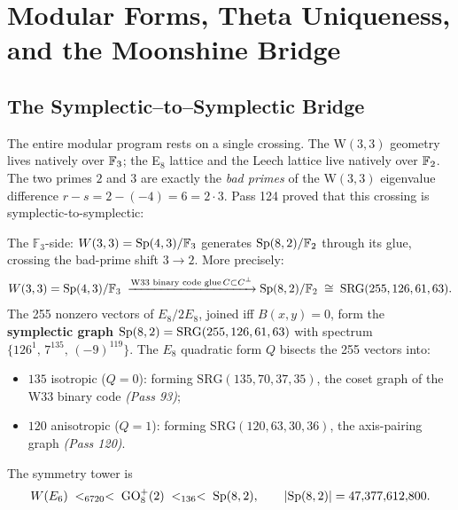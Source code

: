 
\section{Modular Forms, Theta Uniqueness, and the Moonshine Bridge}
\label{sec:modular}

\subsection{The Symplectic–to–Symplectic Bridge}
\label{ssec:bridge}

The entire modular program rests on a single crossing.
The W$(3,3)$ geometry lives natively over $\mathbb{F}_3$;
the E$_8$ lattice and the Leech lattice live natively over $\mathbb{F}_2$.
The two primes $2$ and $3$ are exactly the \emph{bad primes} of the
W$(3,3)$ eigenvalue difference $r - s = 2 - (-4) = 6 = 2 \cdot 3$.
Pass 124 proved that this crossing is symplectic-to-symplectic:

\begin{theorem}
\label{thm:bridge}
The $\mathbb{F}_3$-side:
$W(3,3) = \mathrm{Sp}(4,3)/\mathbb{F}_3$ generates $\mathrm{Sp}(8,2)/\mathbb{F}_2$ through its glue,
crossing the bad-prime shift $3 \to 2$.
More precisely:
\begin{equation}
    W(3,3) = \mathrm{Sp}(4,3)/\mathbb{F}_3
    \;\xrightarrow{\text{W33 binary code glue}\,C \subset C^\perp}
    \mathrm{Sp}(8,2)/\mathbb{F}_2 \;\cong\; \mathrm{SRG}(255,126,61,63).
\end{equation}
The 255 nonzero vectors of $E_8/2E_8$, joined iff $B(x,y) = 0$,
form the \textbf{symplectic graph} $\mathrm{Sp}(8,2) = \mathrm{SRG}(255,126,61,63)$
with spectrum $\{126^1,\, 7^{135},\, (-9)^{119}\}$.
The $E_8$ quadratic form $Q$ bisects the 255 vectors into:
\begin{itemize}[nosep]
  \item $135$ isotropic ($Q=0$): forming $\mathrm{SRG}(135,70,37,35)$,
    the coset graph of the W33 binary code \emph{(Pass 93)};
  \item $120$ anisotropic ($Q=1$): forming $\mathrm{SRG}(120,63,30,36)$,
    the axis-pairing graph \emph{(Pass 120)}.
\end{itemize}
The symmetry tower is
\begin{equation}
    W(E_6) \;<_{6720}<\; \mathrm{GO}^+_8(2) \;<_{136}<\; \mathrm{Sp}(8,2),
    \qquad |\mathrm{Sp}(8,2)| = 47{,}377{,}612{,}800.
\end{equation}
\end{theorem}

